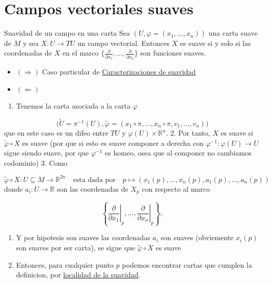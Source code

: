 \chapter{Campos vectoriales suaves}
\label{ch:teo-15}
\begin{bookproposition}{Suavidad de un campo en una carta}
Sea $(U,\varphi=(x_1,\ldots,x_n))$ una carta suave de $M$ y sea $X:U \to TU$ un campo vectorial. Entonces $X$ es suave si y solo si las coordenadas de $X$ en el marco $\{\frac{\partial}{\partial x_1},\ldots,\frac{\partial}{\partial x_n}\}$ son funciones suaves.

\end{bookproposition}
\begin{bookproof}{}
\begin{itemize}
\item $(\Rightarrow)$ Caso particular de \hyperref[blk:3accf8]{Caracterizaciones de suavidad}
\item $(\Leftarrow)$
\end{itemize}
\begin{enumerate}
\item Tenemos la carta asociada a la carta $\varphi$
\end{enumerate}
\[
\bigg(\widetilde U=\pi^{-1}(U),\tilde\varphi=\left(x_1\circ\pi,\ldots,x_n\circ\pi,v_1,\ldots,v_n\right)\bigg)
\]
que en este caso es un difeo entre $TU$ y $\varphi(U)\times\mathbb{R}^n$. 2. Por tanto, $X$ es suave si $\widetilde\varphi\circ X$ es suave (por que si esto es suave componer a derecha con $\varphi ^{-1}:\varphi(U)\rightarrow U$ sigue siendo suave, por que $\varphi ^{-1}$ es homeo, osea que al componer no cambiamos codominio) 3. Como

\[
\widetilde\varphi\circ X:U\subseteq M\longrightarrow\mathbb{R}^{2n}\quad\text{esta dada por}\quad p\longmapsto \left(x_1(p),\ldots,x_n(p),a_1(p),\ldots,a_n(p)\right)
\]
donde $a_i:U\to\mathbb{R}$ son las coordenadas de $X_{p}$ con respecto al marco

\[
\left\{\left.\frac{\partial}{\partial x_1}\right|_p,\ldots,\left.\frac{\partial}{\partial x_n}\right|_p\right\},
\]
\begin{enumerate}[start=4]
\item Y por hipotesis son suaves las coordenadas $a_{i}$ son suaves (obviemente $x_{i}(p)$ son suaves por ser carta), se sigue que $\widetilde\varphi\circ X$ es suave
\item Entonces, para cualquier punto $p$ podemos encontrar cartas que cumplen la definicion, por \hyperref[blk:funcion-suave-entre-variedades]{localidad de la suavidad}.
\end{enumerate}
\bookqed
\end{bookproof}
